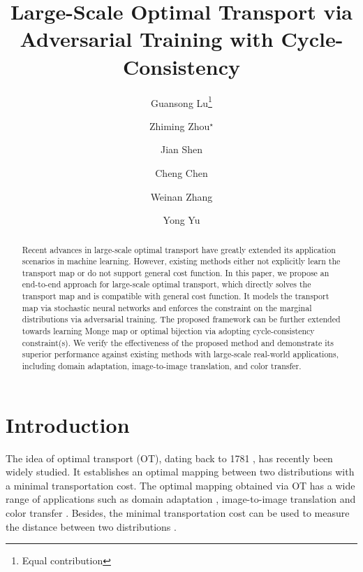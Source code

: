 \documentclass[runningheads]{llncs}
\begin{document}
\pagestyle{plain}
\mainmatter

\title{Large-Scale Optimal Transport via Adversarial Training with Cycle-Consistency} %

\author{Guansong Lu\thanks{Equal contribution} \and
	Zhiming Zhou$^\star$ \and
	Jian Shen \and 
	Cheng Chen \and
	Weinan Zhang \and
	Yong Yu}

\maketitle

\begin{abstract}

Recent advances in large-scale optimal transport have greatly extended its application scenarios in machine learning. However, existing methods either not explicitly learn the transport map or do not support general cost function. In this paper, we propose an end-to-end approach for large-scale optimal transport,  which directly solves the transport map and is compatible with general cost function. It models the transport map via stochastic neural networks and enforces the constraint on the marginal distributions via adversarial training. The proposed framework can be further extended towards learning Monge map or optimal bijection via adopting cycle-consistency constraint(s). We verify the effectiveness of the proposed method and demonstrate its superior performance against existing methods with large-scale real-world applications, including domain adaptation, image-to-image translation, and color transfer. 


\end{abstract}

\section{Introduction}

The idea of optimal transport (OT), dating back to 1781 \cite{monge}, has recently been widely studied. It establishes an optimal mapping between two distributions with a minimal transportation cost. The optimal mapping obtained via OT has a wide range of applications such as domain adaptation \cite{courty2017optimal}, image-to-image translation \cite{ot-cyclegan} and color transfer \cite{ferradans2014regularized}. Besides, the minimal transportation cost can be used to measure the distance between two distributions \cite{rubner2000earth}. 
\end{document}
